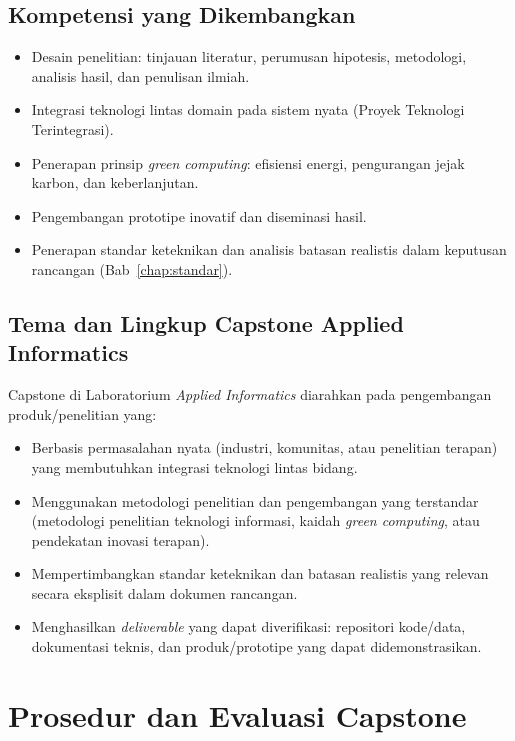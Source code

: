 \documentclass[12pt,a4paper]{report}
\begin{document}
\section{Kompetensi yang Dikembangkan}
\begin{itemize}
\item Desain penelitian: tinjauan literatur, perumusan hipotesis, metodologi, analisis hasil, dan penulisan ilmiah.
\item Integrasi teknologi lintas domain pada sistem nyata (Proyek Teknologi Terintegrasi).
\item Penerapan prinsip \emph{green computing}: efisiensi energi, pengurangan jejak karbon, dan keberlanjutan.
\item Pengembangan prototipe inovatif dan diseminasi hasil.
\item Penerapan standar keteknikan dan analisis batasan realistis dalam keputusan rancangan (Bab~\ref{chap:standar}).
\end{itemize}

\section{Tema dan Lingkup Capstone Applied Informatics}
Capstone di Laboratorium \emph{Applied Informatics} diarahkan pada pengembangan produk/penelitian yang:
\begin{itemize}
\item Berbasis permasalahan nyata (industri, komunitas, atau penelitian terapan) yang membutuhkan integrasi teknologi lintas bidang.
\item Menggunakan metodologi penelitian dan pengembangan yang terstandar (metodologi penelitian teknologi informasi, kaidah \emph{green computing}, atau pendekatan inovasi terapan).
\item Mempertimbangkan standar keteknikan dan batasan realistis yang relevan secara eksplisit dalam dokumen rancangan.
\item Menghasilkan \emph{deliverable} yang dapat diverifikasi: repositori kode/data, dokumentasi teknis, dan produk/prototipe yang dapat didemonstrasikan.
\end{itemize}

\chapter{Prosedur dan Evaluasi Capstone}
\end{document}
